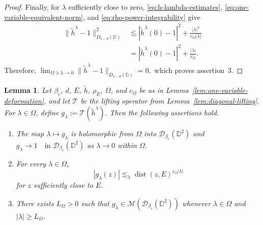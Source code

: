 \documentclass[a4paper,12pt]{amsart}
\newtheorem{lem}[thm]{Lemma}
\theoremstyle{definition}
\begin{document}
\begin{proof}
Finally, for $\lambda$ sufficiently close to zero,
\eqref{eq:h-lambda-estimates},
\eqref{eq:one-variable-equivalent-norm}, and
\eqref{eq:rho-power-integrability} give
\[
\begin{aligned}
    \|\widetilde h^\lambda-1\|_{D_{1-d}(\mathbb D)}^2
    &\lesssim
    |\widetilde h^\lambda(0)-1|^2
    +\frac{|\lambda|^2}{c_\Omega|\lambda|}\\
    &=
    |\widetilde h^\lambda(0)-1|^2
    +\frac{|\lambda|}{c_\Omega}.
\end{aligned}
\]
Therefore,
$
    \lim_{\Omega\ni\lambda\to0}
    \|\widetilde h^\lambda-1\|_{D_{1-d}(\mathbb D)}
    =0,
$
which proves assertion~3.
\end{proof}

\begin{lem}\label{lem:lifted-analytic-deformation}
Let $\beta_c$, $d$, $E$, $\widetilde h$, $\rho_E$, $\Omega$, and
$c_\Omega$ be as in Lemma~\ref{lem:one-variable-deformation}, and let
$\mathcal T$ be the lifting operator from
Lemma~\ref{lem:diagonal-lifting}. For $\lambda\in\Omega$, define
$
    g_\lambda:=\mathcal T(\widetilde h^\lambda).
$
Then the following assertions hold.
\begin{enumerate}
    \item The map
    $
        \lambda\longmapsto g_\lambda
    $
    is holomorphic from $\Omega$ into
    $\mathcal D_{\beta_c}(\mathbb D^2)$ and
    $
        g_\lambda\longrightarrow1
        \quad\text{in }\mathcal D_{\beta_c}(\mathbb D^2)
    $
    as $\lambda\to0$ within $\Omega$.

    \item For every $\lambda\in\Omega$,
    \[
        |g_\lambda(z)|
        \lesssim_\lambda
        \operatorname{dist}(z,E)^{c_\Omega|\lambda|}
    \]
    for $z$ sufficiently close to $E$.

    \item There exists $L_\Omega>0$ such that
    $
        g_\lambda\in\mathcal M(\mathcal D_{\beta_c}(\mathbb D^2))
    $
    whenever $\lambda\in\Omega$ and $|\lambda|\geq L_\Omega$.
\end{enumerate}
\end{lem}
\end{document}
